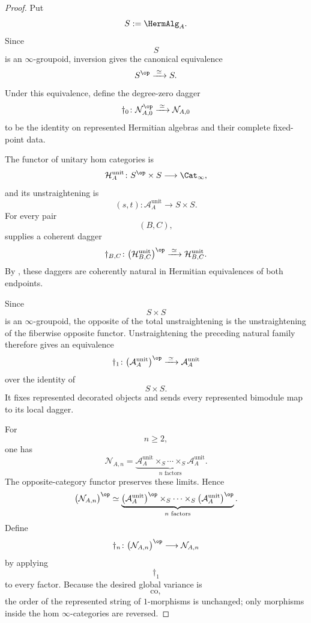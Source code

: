 \begin{proof}
Put
\[
    S
    :=
    \HermAlg_A.
\]
Since
\[
    S
\]
is an $\infty$-groupoid, inversion gives the canonical equivalence
\[
    S^{\op}
    \xrightarrow{\;\simeq\;}
    S.
\]
Under this equivalence, define the degree-zero dagger
\[
    \dagger_0
    \colon
    \mathcal N_{A,0}^{\op}
    \xrightarrow{\;\simeq\;}
    \mathcal N_{A,0}
\]
to be the identity on represented Hermitian algebras and their complete
fixed-point data.

The functor of unitary hom categories is
\[
    \mathcal H_A^{\mathrm{unit}}
    \colon
    S^{\op}\times S
    \longrightarrow
    \Cat_\infty,
\]
and its unstraightening is
\[
    (s,t)
    \colon
    \mathcal A_A^{\mathrm{unit}}
    \longrightarrow
    S\times S.
\]
For every pair
\[
    (B,C),
\]
 supplies a coherent dagger
\[
    \dagger_{B,C}
    \colon
    \bigl(
        \mathcal H^{\mathrm{unit}}_{B,C}
    \bigr)^{\op}
    \xrightarrow{\;\simeq\;}
    \mathcal H^{\mathrm{unit}}_{B,C}.
\]
By
,
these daggers are coherently natural in Hermitian equivalences of both
endpoints.

Since
\[
    S\times S
\]
is an $\infty$-groupoid, the opposite of the total unstraightening is
the unstraightening of the fiberwise opposite functor. Unstraightening
the preceding natural family therefore gives an equivalence
\[
    \dagger_1
    \colon
    \bigl(
        \mathcal A_A^{\mathrm{unit}}
    \bigr)^{\op}
    \xrightarrow{\;\simeq\;}
    \mathcal A_A^{\mathrm{unit}}
\]
over the identity of
\[
    S\times S.
\]
It fixes represented decorated objects and sends every represented
bimodule map to its local dagger.

For
\[
    n\geq2,
\]
one has
\[
    \mathcal N_{A,n}
    =
    \underbrace{
        \mathcal A_A^{\mathrm{unit}}
        \times_S
        \cdots
        \times_S
        \mathcal A_A^{\mathrm{unit}}
    }_{n\text{ factors}}.
\]
The opposite-category functor preserves these limits. Hence
\[
\begin{aligned}
    \bigl(
        \mathcal N_{A,n}
    \bigr)^{\op}
    \simeq
    \underbrace{
        \bigl(
            \mathcal A_A^{\mathrm{unit}}
        \bigr)^{\op}
        \times_S
        \cdots
        \times_S
        \bigl(
            \mathcal A_A^{\mathrm{unit}}
        \bigr)^{\op}
    }_{n\text{ factors}}.
\end{aligned}
\]
Define
\[
    \dagger_n
    \colon
    \bigl(
        \mathcal N_{A,n}
    \bigr)^{\op}
    \longrightarrow
    \mathcal N_{A,n}
\]
by applying
\[
    \dagger_1
\]
to every factor. Because the desired global variance is
\[
    \mathrm{co},
\]
the order of the represented string of $1$-morphisms is unchanged; only
morphisms inside the hom $\infty$-categories are reversed.


\end{proof}
